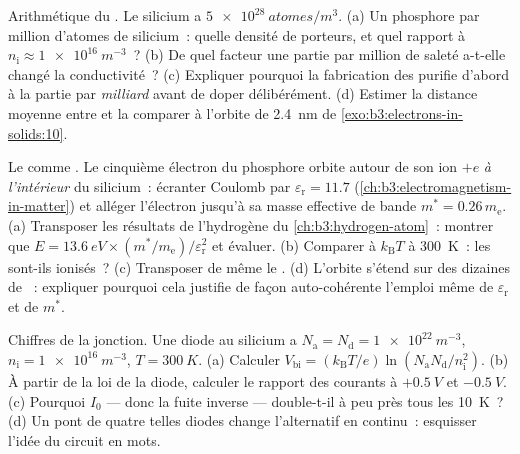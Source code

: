 \begin{exercise}[$\star\star$]\label{exo:b3:electrons-in-solids:9}
Arithmétique du . Le silicium a $\qty{5e28}{atomes/m^3}$. (a) Un
phosphore par million d'atomes de silicium~: quelle densité de
porteurs, et quel rapport à $n_{\text{i}} \approx \qty{1e16}{m^{-3}}$~?
(b) De quel facteur une partie par million de saleté a-t-elle changé
la conductivité~? (c) Expliquer pourquoi la
fabrication des  purifie d'abord à la partie par
\emph{milliard} avant de doper délibérément. (d) Estimer la distance
moyenne entre  et la comparer à l'orbite de \qty{2.4}{nm} de
\cref{exo:b3:electrons-in-solids:10}.
\end{exercise}

\begin{exercise}[$\star\star\star$]\label{exo:b3:electrons-in-solids:10}
Le  comme . Le cinquième électron du phosphore
orbite autour de son ion $+e$ \emph{à l'intérieur} du silicium~:
écranter Coulomb par $\varepsilon_{\text{r}} = 11.7$
(\cref{ch:b3:electromagnetism-in-matter}) et alléger l'électron
jusqu'à sa masse effective de bande $m^* = 0.26\,m_{\text{e}}$.
(a) Transposer les résultats de l'hydrogène du
\cref{ch:b3:hydrogen-atom}~: montrer que
$E = \qty{13.6}{eV}\times(m^*/m_{\text{e}})/
\varepsilon_{\text{r}}^2$ et évaluer. (b) Comparer à
$k_{\text{B}}T$ à \qty{300}{K}~: les  sont-ils ionisés~? (c)
Transposer de même le . (d) L'orbite s'étend sur des
dizaines de ~: expliquer pourquoi cela justifie de façon
auto-cohérente l'emploi même de $\varepsilon_{\text{r}}$ et de $m^*$.
\end{exercise}

\begin{exercise}[$\star\star\star$]\label{exo:b3:electrons-in-solids:11}
Chiffres de la jonction. Une diode au silicium a $N_{\text{a}} =
N_{\text{d}} = \qty{1e22}{m^{-3}}$, $n_{\text{i}} =
\qty{1e16}{m^{-3}}$, $T = \qty{300}{K}$. (a) Calculer
$V_{\text{bi}} = (k_{\text{B}}T/e)\ln(N_{\text{a}}N_{\text{d}}/
n_{\text{i}}^2)$. (b) À partir de la loi de la diode, calculer le
rapport des courants à $+\qty{0.5}{V}$ et $-\qty{0.5}{V}$. (c)
Pourquoi $I_0$ --- donc la fuite inverse --- double-t-il à peu près
tous les \qty{10}{K}~? (d) Un pont de quatre telles diodes change
l'alternatif en continu~: esquisser l'idée du circuit en mots.
\end{exercise}

